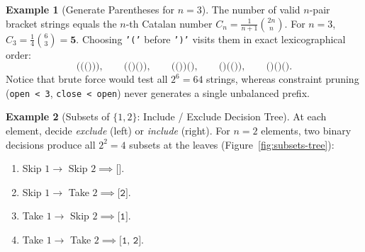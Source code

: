 \documentclass[11pt,a4paper]{article}
\theoremstyle{definition}
\newtheorem{example}{Example}[section]
\begin{document}
\begin{example}[Generate Parentheses for $n = 3$]
The number of valid $n$-pair bracket strings equals the $n$-th Catalan number $C_n = \frac{1}{n+1}\binom{2n}{n}$. For $n = 3$, $C_3 = \frac{1}{4}\binom{6}{3} = \mathbf{5}$. Choosing \texttt{'('} before \texttt{')'} visits them in exact lexicographical order:
\[
    \texttt{((()))},\qquad \texttt{(()())},\qquad \texttt{(())()},\qquad \texttt{()(())},\qquad \texttt{()()()}.
\]
Notice that brute force would test all $2^6 = 64$ strings, whereas constraint pruning (\texttt{open < 3}, \texttt{close < open}) never generates a single unbalanced prefix.
\end{example}

\begin{example}[Subsets of $\{1, 2\}$: Include / Exclude Decision Tree]
At each element, decide \emph{exclude} (left) or \emph{include} (right). For $n = 2$ elements, two binary decisions produce all $2^2 = 4$ subsets at the leaves (Figure~\ref{fig:subsets-tree}):
\begin{enumerate}
    \item Skip $1 \to$ Skip $2 \implies \texttt{[]}$.
    \item Skip $1 \to$ Take $2 \implies \texttt{[2]}$.
    \item Take $1 \to$ Skip $2 \implies \texttt{[1]}$.
    \item Take $1 \to$ Take $2 \implies \texttt{[1, 2]}$.
\end{enumerate}
\end{example}
\end{document}

